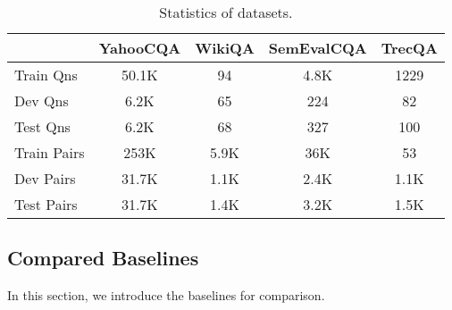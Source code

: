 \documentclass[sigconf]{acmart}
\begin{document}
\begin{table}[H]
  \centering
  \small
    \begin{tabular}{lcccc}
    \hline
         			& YahooCQA & WikiQA & SemEvalCQA   & TrecQA\\
          \hline
    Train Qns &   50.1K  & 94        &  4.8K  & 1229 \\
    Dev Qns & 6.2K & 65      &224    &  82 \\
    Test Qns & 6.2K & 68    &  327   & 100 \\
    \hline
    Train Pairs & 253K& 5.9K   &36K   & 53 \\
    Dev Pairs &31.7K &1.1K   &2.4K  &   1.1K\\
    Test Pairs & 31.7K &  1.4K & 3.2K    & 1.5K \\
    \hline
    \end{tabular}\caption{Statistics of datasets.}
  \label{tab:dataset}\end{table}




\subsection{Compared Baselines}

In this section, we introduce the baselines for comparison. 
\end{document}
